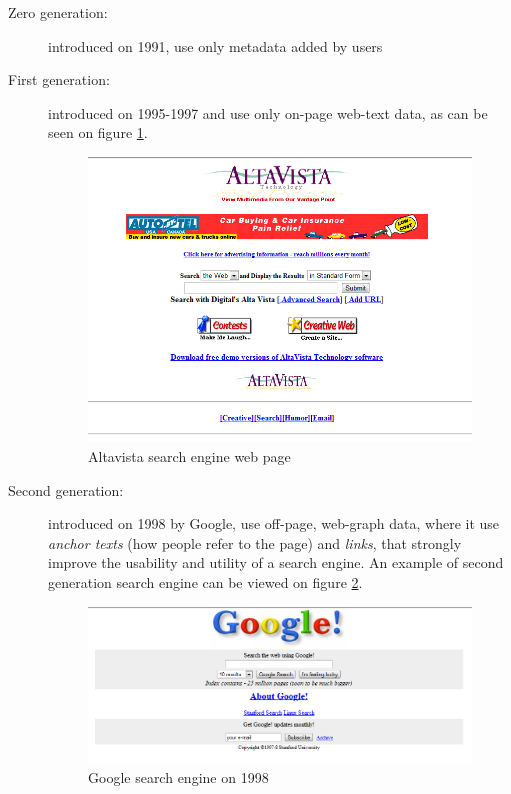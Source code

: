 \begin{description}
    \item [Zero generation: ] introduced on 1991, use only metadata added by users
    \item [First generation: ] introduced on 1995-1997 and use only on-page web-text data, as can be seen on 
                               figure \ref{img:altavista}.
                               \begin{figure}
                                    \caption{Altavista search engine web page}
                                    \label{img:altavista}
                                    \includegraphics[width=\textwidth]{Images/altavista}
                                \end{figure}
    \item [Second generation: ] introduced on 1998 by Google, use off-page, web-graph data, where it
                                use \emph{anchor texts} (how people refer to the page) and \emph{links}, that
                                strongly improve the usability and utility of a search engine.
                                An example of second generation search engine can be viewed on figure \ref{img:google}.
                                \begin{figure}
                                    \caption{Google search engine on 1998}
                                    \label{img:google}
                                    \includegraphics[width=\textwidth]{Images/google}

\end{figure}
\end{description}
